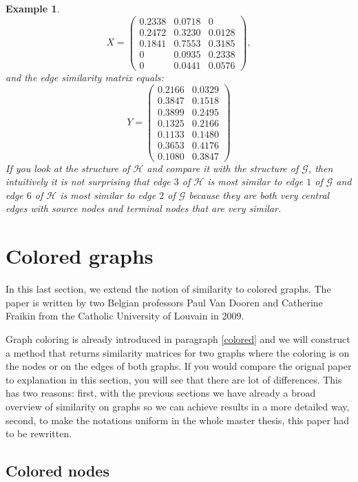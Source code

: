\documentclass[a4paper,11pt]{report}
\newtheorem{example}[theorem]{Example}
\newcommand{\graf}{\mathscr{G}}
\newcommand{\grafeen}{\mathscr{H}}
\begin{document}
\begin{example}
$$X = \begin{pmatrix}
0.2338  &  0.0718  &       0\\
0.2472   & 0.3230  &  0.0128\\
0.1841   &  0.7553 &   0.3185\\
0  &  0.0935  &  0.2338\\
0   & 0.0441 &   0.0576
\end{pmatrix},$$
 and the edge similarity matrix equals:
 $$ Y = \begin{pmatrix}
0.2166 & 0.0329\\
0.3847 & 0.1518\\
0.3899 & 0.2495\\
0.1325 & 0.2166\\
0.1133 & 0.1480\\
0.3653 & 0.4176\\
0.1080 & 0.3847
\end{pmatrix}$$
If you look at the structure of $\grafeen$ and compare it with the structure of $\graf$, then 
intuitively it is not surprising that edge $3$ of $\grafeen$ is most similar to edge $1$ of 
$\graf$ and edge $6$ of $\grafeen$ is most similar to edge $2$ of $\graf$ because they are both very
central edges with source nodes and terminal nodes that are very similar.
 \end{example}
 


\section{Colored graphs}
In this last section, we extend the notion of similarity to colored graphs. The 
paper \cite{vandoren} is written by two Belgian professors Paul Van Dooren and 
Catherine Fraikin from the Catholic University of 
Louvain in 2009.

Graph coloring is already introduced in paragraph \ref{colored} and we will 
construct a method that returns similarity matrices for two graphs where the coloring is on the nodes or 
on the edges of both graphs. If you would compare the orignal paper to 
explanation in this section, you will see that there are lot of differences. 
This has two reasons: first, with the previous sections we have already a broad overview of 
similarity on graphs so we can achieve results in a more detailed way, second, to make 
the notations uniform in the whole master thesis, this paper had to be 
rewritten.


\subsection{Colored nodes}
\end{document}
